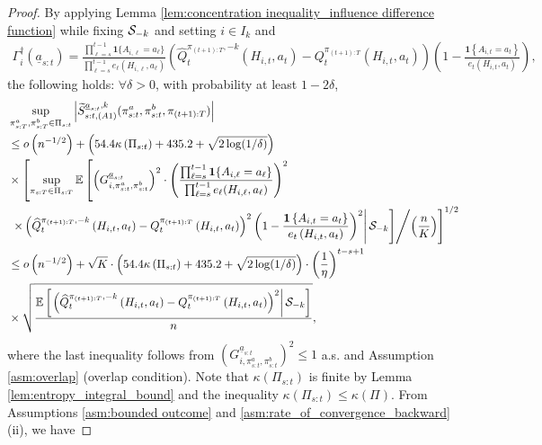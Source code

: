 \begin{proof}
By applying Lemma \ref{lem:concentration inequality_influence difference function} while fixing $\mathcal{S}_{-k}$ and setting $i \in I_k$ and 
\begin{align*}
    \Gamma_{i}^{\dag}(\underline{a}_{s:t})= \frac{\prod_{\ell=s}^{t-1}\mathbf{1}\{A_{i,\ell}=a_{\ell}\}}{\prod_{\ell=s}^{t-1}e_{\ell}(H_{i,\ell},a_{\ell})}\left(\widehat{Q}_{t}^{\pi_{(t+1):T},-k}\left(H_{i,t},a_{t}\right)-Q_{t}^{\pi_{(t+1):T}}\left(H_{i,t},a_{t}\right)\right)\left(1-\frac{\mathbf{1}\left\{ A_{i,t}=a_{t}\right\} }{e_{t}\left(H_{i,t},a_{t}\right)}\right),
\end{align*}
the following holds: $\forall \delta > 0$, with probability at least $1-2\delta$,
\begin{align*}
&\sup_{\pi_{s:T}^{a},\pi_{s:T}^{b}\in \Pi_{s:t}}\left|\widetilde{S}_{s:t,(A1)}^{\underline{a}_{s:t},k}(\pi_{s:t}^{a},\pi_{s:t}^{b},\pi_{(t+1):T})\right|\\
&\leq	o\left(n^{-1/2}\right)+\left(54.4\kappa\left(\Pi_{s:t}\right)+435.2+\sqrt{2\log(1/\delta)}\right) \\
	&\times\left[\sup_{\pi_{s:T}\in \Pi_{s:T}}\mathbb{E}\left[\left(G_{i,\pi_{s:t}^{a},\pi_{s:t}^{b}}^{\underline{a}_{s:t}}\right)^{2}\cdot\left(\frac{\prod_{\ell=s}^{t-1}\mathbf{1}\{A_{i,\ell}=a_{\ell}\}}{\prod_{\ell=s}^{t-1}e_{\ell}(H_{i,\ell},a_{\ell})}\right)^{2}\right.\right.\\
&	\left.\left.\left.\times\left(\widehat{Q}_{t}^{\pi_{(t+1):T},-k}\left(H_{i,t},a_{t}\right)-Q_{t}^{\pi_{(t+1):T}}\left(H_{i,t},a_{t}\right)\right)^{2}\left(1-\frac{\mathbf{1}\left\{ A_{i,t}=a_{t}\right\} }{e_{t}\left(H_{i,t},a_{t}\right)}\right)^{2}\right|\mathcal{S}_{-k} \right] \middle/ \left(\frac{n}{K}\right) \right]^{1/2} \\
&\leq	o\left(n^{-1/2}\right)+\sqrt{K} \cdot \left(54.4\kappa\left(\Pi_{s:t}\right)+435.2+\sqrt{2\log(1/\delta)}\right)
	\cdot \left(\frac{1}{\eta}\right)^{t-s+1}\\
	&\times \sqrt{\frac{\mathbb{E}\left[\left.\left(\widehat{Q}_{t}^{\pi_{(t+1):T},-k}\left(H_{i,t},a_{t}\right)-Q_{t}^{\pi_{(t+1):T}}\left(H_{i,t},a_{t}\right)\right)^2\right|\mathcal{S}_{-k} \right]}{n}},
\end{align*}
where the last inequality follows from $\left(G_{i,\pi_{s:t}^{a},\pi_{s:t}^{b}}^{\underline{a}_{s:t}}\right)^{2}\leq 1$ a.s. and Assumption \ref{asm:overlap} (overlap condition). 
Note that $\kappa\left(\Pi_{s:t}\right)$ is finite by Lemma \ref{lem:entropy_integral_bound} and the inequality $\kappa\left(\Pi_{s:t}\right) \leq \kappa\left(\Pi \right)$.
From Assumptions \ref{asm:bounded outcome} and \ref{asm:rate_of_convergence_backward} (ii), we have 

\end{proof}
